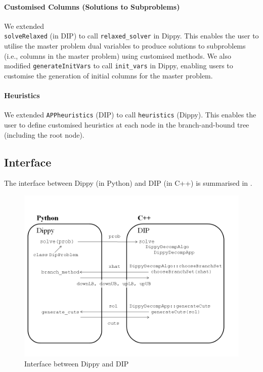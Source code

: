 \paragraph{Customised Columns (Solutions to Subproblems)} We extended \\ {\tt solveRelaxed} (in \ac{DIP}) to call {\tt relaxed\_solver} in Dippy. This enables the user to utilise the master problem dual variables to produce solutions to subproblems (i.e., columns in the master problem) using customised methods. We also modified {\tt generateInitVars} to call {\tt init\_vars} in Dippy, enabling users to customise the generation of initial columns for the master problem.

\paragraph{Heuristics} We extended {\tt APPheuristics} (\ac{DIP}) to call {\tt heuristics} (Dippy). This enables the user to define customised heuristics at each node in the branch-and-bound tree (including the root node).

\subsection{Interface}

The interface between Dippy (in Python) and DIP (in C++) is summarised in .
\begin{figure}[htp]
\includegraphics[bb=0 0 960 720,scale=0.45]{interface.png}
\caption{Interface between Dippy and DIP} \label{fig:interface}
\end{figure}

